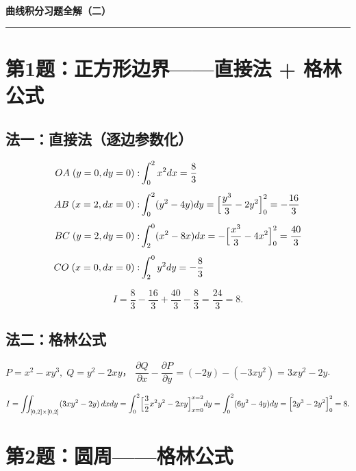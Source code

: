 \documentclass[12pt,a4paper]{ctexart}
\newcommand{\answerbox}[1]{%
  \begin{center}\fbox{\color{red}\large\bfseries #1}\end{center}}
\begin{document}
\begin{center}{\Huge\bfseries 曲线积分习题全解（二）}\end{center}
\vspace{8pt}\hrule\vspace{8pt}

\section{第1题：正方形边界——直接法 + 格林公式}


\subsection*{法一：直接法（逐边参数化）}

\[
\begin{aligned}
OA\;(y=0,dy=0): & \int_0^2 x^2dx = \frac{8}{3} \\[4pt]
AB\;(x=2,dx=0): & \int_0^2 (y^2-4y)dy = \Bigl[\frac{y^3}{3}-2y^2\Bigr]_0^2 = -\frac{16}{3} \\[4pt]
BC\;(y=2,dy=0): & \int_2^0 (x^2-8x)dx = -\Bigl[\frac{x^3}{3}-4x^2\Bigr]_0^2 = \frac{40}{3} \\[4pt]
CO\;(x=0,dx=0): & \int_2^0 y^2dy = -\frac{8}{3}
\end{aligned}
\]

\[
I = \frac{8}{3} - \frac{16}{3} + \frac{40}{3} - \frac{8}{3} = \frac{24}{3} = 8.
\]

\subsection*{法二：格林公式}

$P=x^2-xy^3,\;Q=y^2-2xy$，
$\dfrac{\partial Q}{\partial x}-\dfrac{\partial P}{\partial y} = (-2y) - (-3xy^2) = 3xy^2-2y$.

\[
I = \iint_{[0,2]\times[0,2]} (3xy^2-2y)\,dxdy
   = \int_0^2\Bigl[\frac{3}{2}x^2y^2-2xy\Bigr]_{x=0}^{x=2}dy
   = \int_0^2(6y^2-4y)dy
   = \Bigl[2y^3-2y^2\Bigr]_0^2 = 8.
\]

\answerbox{$I = 8$}

\section{第2题：圆周——格林公式}
\end{document}
